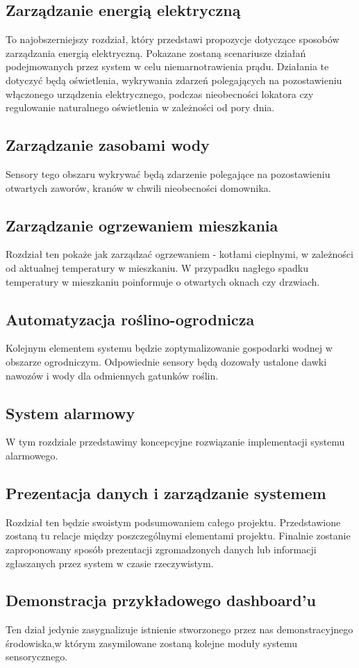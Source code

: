 \documentclass[12pt]{article} %
\begin{document}
\subsection{Zarządzanie energią elektryczną}
To najobszerniejszy rozdział, który przedstawi propozycje dotyczące sposobów zarządzania energią elektryczną. Pokazane zostaną scenariusze działań podejmowanych przez system w celu niemarnotrawienia prądu. Działania te dotyczyć będą oświetlenia, wykrywania zdarzeń polegających na pozostawieniu   włączonego urządzenia elektrycznego, podczas nieobecności lokatora czy regulowanie naturalnego oświetlenia w zależności od pory dnia.

\subsection{Zarządzanie zasobami wody}
Sensory tego obszaru wykrywać będą zdarzenie polegające na pozostawieniu otwartych zaworów, kranów w chwili nieobecności domownika.

\subsection{Zarządzanie ogrzewaniem mieszkania}
Rozdział ten pokaże jak zarządzać ogrzewaniem - kotłami cieplnymi, w zależności od aktualnej temperatury w mieszkaniu. W przypadku nagłego spadku temperatury w mieszkaniu poinformuje o otwartych oknach czy drzwiach.

\subsection{Automatyzacja roślino-ogrodnicza}
Kolejnym elementem systemu będzie zoptymalizowanie gospodarki wodnej w obszarze ogrodniczym. Odpowiednie sensory będą dozowały ustalone dawki nawozów i wody dla odmiennych gatunków roślin.

\subsection{System alarmowy}
W tym rozdziale przedstawimy koncepcyjne rozwiązanie implementacji systemu alarmowego.

\subsection{Prezentacja danych i zarządzanie systemem}
Rozdział ten będzie swoistym podsumowaniem całego projektu. Przedstawione zostaną tu relacje między poszczególnymi elementami projektu. Finalnie zostanie zaproponowany sposób prezentacji zgromadzonych danych lub informacji zgłaszanych przez system w czasie rzeczywistym.

\subsection{Demonstracja przykładowego dashboard'u}
Ten dział jedynie zasygnalizuje istnienie stworzonego przez nas demonstracyjnego środowiska,w którym zasymilowane zostaną kolejne moduły systemu sensorycznego.
\end{document}

